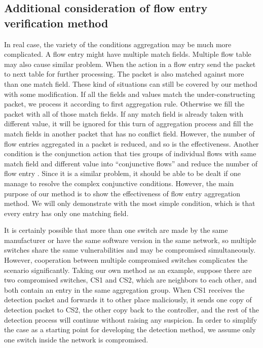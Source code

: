 \subsection{Additional consideration of flow entry verification method}
\label{Further_discussion}

In real case, the variety of the conditions aggregation may be much more complicated. A flow entry might have multiple match fields. Multiple flow table may also cause similar problem. When the action in a flow entry send the packet to next table for further processing. The packet is also matched against more than one match field. These kind of situations can still be covered by our method with some modification. 
If all the fields and values match the under-constructing packet, we process it according to first aggregation rule. Otherwise we fill the packet with all of those match fields. If any match field is already taken with different value, it will be ignored for this turn of aggregation process and fill the match fields in another packet that has no conflict field. However, the number of flow entries aggregated in a packet is reduced, and so is the effectiveness. Another condition is the conjunction action that ties groups of individual flows with same match field and different value into ``conjunctive flows'' and reduce the number of flow entry \cite{OVS_OFCTL}. Since it is a similar problem, it should be able to be dealt if one manage to resolve the complex conjunctive conditions. However, the main purpose of our method is to show the effectiveness of flow entry aggregation method. We will only demonstrate with the most simple condition, which is that every entry has only one matching field.

It is certainly possible that more than one switch are made by the same manufacturer or have the same software version in the same network, so multiple switches share the same vulnerabilities and may be compromised simultaneously. However, cooperation between multiple compromised switches complicates the scenario significantly. Taking our own method as an example, suppose there are two compromised switches, CS1 and CS2, which are neighbors to each other, and both contain an entry in the same aggregation group. When CS1 receives the detection packet and forwards it to other place maliciously, it sends one copy of detection packet to CS2, the other copy back to the controller, and the rest of the detection process will continue without raising any suspicion\sout{}. In order to simplify the case as a starting point for developing the detection method, we assume only one switch inside the network is compromised.

